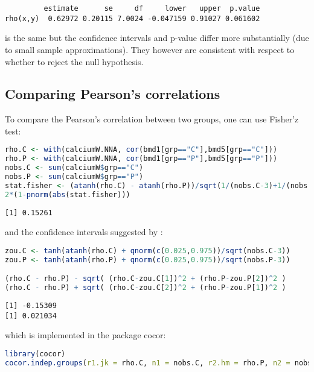 \documentclass[12pt]{article}
\begin{document}
\label{}
\begin{verbatim}
         estimate      se     df     lower   upper  p.value
rho(x,y)  0.62972 0.20115 7.0024 -0.047159 0.91027 0.061602
\end{verbatim}


is the same but the confidence intervals and p-value differ more
substantially (due to small sample approximations). They however are
consistent with respect to whether to reject the null hypothesis.




\clearpage
\subsection{Comparing Pearson's correlations}
\label{sec:org3ce6e82}

To compare the Pearson's correlation between two groups, one can use
Fisher'z test:
\begin{lstlisting}[language=r,numbers=none]
rho.C <- with(calciumW.NNA, cor(bmd1[grp=="C"],bmd5[grp=="C"]))
rho.P <- with(calciumW.NNA, cor(bmd1[grp=="P"],bmd5[grp=="P"]))
nobs.C <- sum(calciumW$grp=="C")
nobs.P <- sum(calciumW$grp=="P")
stat.fisher <- (atanh(rho.C) - atanh(rho.P))/sqrt(1/(nobs.C-3)+1/(nobs.P-3))
2*(1-pnorm(abs(stat.fisher)))
\end{lstlisting}

\label{}
\begin{verbatim}
[1] 0.15261
\end{verbatim}


and the confidence intervals suggested by \cite{zou2007toward}:
\begin{lstlisting}[language=r,numbers=none]
zou.C <- tanh(atanh(rho.C) + qnorm(c(0.025,0.975))/sqrt(nobs.C-3))
zou.P <- tanh(atanh(rho.P) + qnorm(c(0.025,0.975))/sqrt(nobs.P-3))

(rho.C - rho.P) - sqrt( (rho.C-zou.C[1])^2 + (rho.P-zou.P[2])^2 )
(rho.C - rho.P) + sqrt( (rho.C-zou.C[2])^2 + (rho.P-zou.P[1])^2 )
\end{lstlisting}

\label{}
\begin{verbatim}
[1] -0.15309
[1] 0.021034
\end{verbatim}


which is implemented in the package cocor:
\begin{lstlisting}[language=r,numbers=none]
library(cocor)
cocor.indep.groups(r1.jk = rho.C, n1 = nobs.C, r2.hm = rho.P, n2 = nobs.P)
\end{lstlisting}
\end{document}
